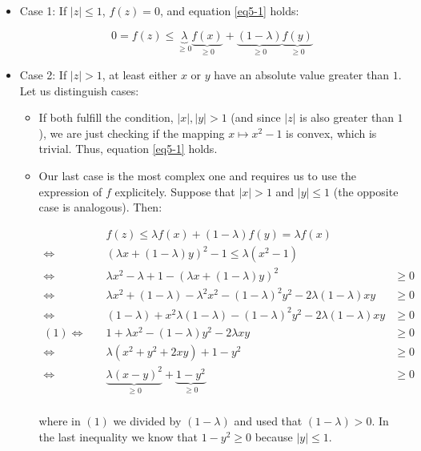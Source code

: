 \documentclass[11pt,table]{article}
\begin{document}
	\begin{itemize}
		\item Case 1: If $|z| \leq 1$, $f(z) = 0$, and equation \ref{eq5-1} holds:
		
		\[
		0 = f(z) \le \underbrace{\lambda}_{\ge 0} \underbrace{f(x)}_{\ge 0} + \underbrace{(1 - \lambda)}_{\ge 0} \underbrace{f(y)}_{\ge 0}
		\]
		
		\item Case 2: If $|z| > 1$, at least either $x$ or $y$ have an absolute value greater than $1$. Let us distinguish cases:
		\begin{itemize}
			\item If both fulfill the condition, $|x|, |y| > 1$ (and since $|z|$ is also greater than $1$), we are just checking if the mapping $x \mapsto x^2 - 1$ is convex, which is trivial. Thus, equation \ref{eq5-1} holds.
			\item Our last case is the most complex one and requires us to use the expression of $f$ explicitely. Suppose that $|x| > 1$ and $|y| \le 1$ (the opposite case is analogous). Then:
			
			\begin{align*}
				& f(z) \le \lambda f(x) + (1 - \lambda) f(y) = \lambda f(x) \\
				\Longleftrightarrow \quad & \left(\lambda x + (1 - \lambda) y\right)^2 - 1 \le \lambda \left(x^2 - 1\right) \\
				\Longleftrightarrow \quad & \lambda x^2 - \lambda + 1 - \left(\lambda x + (1 - \lambda) y\right)^2 & \ge 0 \\
				\Longleftrightarrow \quad & \lambda x^2 + (1 - \lambda) - \lambda^2 x^2 - (1 - \lambda)^2 y^2 - 2\lambda (1 - \lambda) x y & \ge 0\\
				\Longleftrightarrow \quad & (1 - \lambda) + x^2 \lambda(1 - \lambda) - (1 - \lambda)^2 y^2 - 2\lambda (1 - \lambda) x y & \ge 0 \\
				(1) \Longleftrightarrow \quad & 1 + \lambda x^2 - (1 - \lambda) y^2 - 2\lambda x y & \ge 0 \\
				\Longleftrightarrow \quad & \lambda(x^2 + y^2 + 2xy) + 1 - y^2 & \ge 0 \\
				\Longleftrightarrow \quad & \underbrace{\lambda(x - y)^2}_{\ge 0} + \underbrace{1 - y^2}_{\ge 0} & \ge 0\\
			\end{align*}
			
			where in $(1)$ we divided by $(1-\lambda)$ and used that $(1 - \lambda) > 0$. In the last inequality we know that \(1 - y^2 \ge 0\) because \(|y| \le 1\). 
			
		\end{itemize}
	\end{itemize}
	
\end{document}
